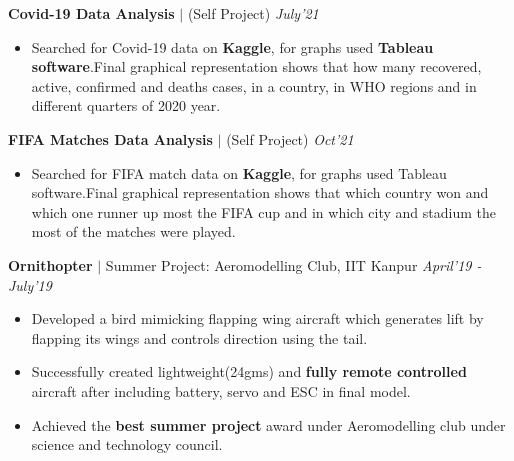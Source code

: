 \documentclass[10pt]{extarticle}
\begin{document}
\hspace{-1.5mm}\textbf{Covid-19 Data Analysis} $|$ (Self Project)
\hfill\hfill\textit{\href{https://public.tableau.com/app/profile/ankit.lakhiwal/viz/Covid-19DataAnalysis_16276722946220/Dashboard1}{\faChartPie} July'21} 
\begin{itemize}
\item Searched for Covid-19 data on \textbf{Kaggle}, for graphs used \textbf{Tableau software}.Final graphical representation shows that how many recovered, active, confirmed and deaths cases, in a country, in WHO regions and in different quarters of 2020 year.
\end{itemize}
\vspace{1.5mm}

\hspace{-1.5mm}\textbf{FIFA Matches Data Analysis} $|$ (Self Project)
\hfill\hfill\textit{\href{https://public.tableau.com/app/profile/ankit.lakhiwal/viz/Fifamatchdataanalysis/Sheet6}{\faChartPie} Oct'21} 
\begin{itemize}
\item Searched for FIFA match data on \textbf{Kaggle}, for graphs used Tableau software.Final graphical representation shows that which country won and which one runner up most the FIFA cup and in which city and stadium the most of the matches were played.
\end{itemize}
\vspace{1.5mm}

\hspace{-2.7mm}
\textbf{Ornithopter} $|$ Summer Project: Aeromodelling Club, IIT Kanpur
\hfill\hfill\textit{\href{https://drive.google.com/drive/folders/10ncwIcoz3mCMsF_QOLuh80orXczK1xUd?usp=sharing}{\faGoogleDrive} April'19 - July'19} 
\begin{itemize}
\item Developed a bird mimicking flapping wing aircraft which generates lift by flapping its wings and controls direction using the tail.
\item Successfully created lightweight(24gms) and \textbf{fully remote controlled} aircraft after including battery, servo and ESC in final model.
\item Achieved the \textbf{best summer project} award under Aeromodelling club under science and technology council.
\end{itemize}
\vspace{2.5mm}
\end{document}
